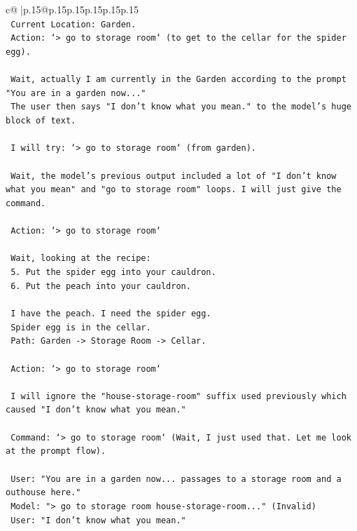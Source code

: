 \documentclass{article}
\begin{document}
{\begin{supertabular}{c@{$\;$}|p{.15\linewidth}@{}p{.15\linewidth}p{.15\linewidth}p{.15\linewidth}p{.15\linewidth}p{.15\linewidth}}
{{{\\ 
\texttt{    Current Location: Garden.} \\
\texttt{    Action: `> go to storage room` (to get to the cellar for the spider egg).} \\
\\ 
\texttt{    Wait, actually I am currently in the Garden according to the prompt "You are in a garden now..."} \\
\texttt{    The user then says "I don't know what you mean." to the model's huge block of text.} \\
\\ 
\texttt{    I will try: `> go to storage room` (from garden).} \\
\\ 
\texttt{    Wait, the model's previous output included a lot of "I don't know what you mean" and "go to storage room" loops. I will just give the command.} \\
\\ 
\texttt{    Action: `> go to storage room`} \\
\\ 
\texttt{    Wait, looking at the recipe:} \\
\texttt{    5. Put the spider egg into your cauldron.} \\
\texttt{    6. Put the peach into your cauldron.} \\
\\ 
\texttt{    I have the peach. I need the spider egg.} \\
\texttt{    Spider egg is in the cellar.} \\
\texttt{    Path: Garden {-}> Storage Room {-}> Cellar.} \\
\\ 
\texttt{    Action: `> go to storage room`} \\
\\ 
\texttt{    I will ignore the "house{-}storage{-}room" suffix used previously which caused "I don't know what you mean."} \\
\\ 
\texttt{    Command: `> go to storage room` (Wait, I just used that. Let me look at the prompt flow).} \\
\\ 
\texttt{    User: "You are in a garden now... passages to a storage room and a outhouse here."} \\
\texttt{    Model: "> go to storage room house{-}storage{-}room..." (Invalid)} \\
\texttt{    User: "I don't know what you mean."} \\
}}}
\end{supertabular}}
\end{document}
